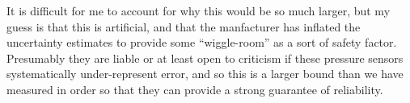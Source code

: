 \documentclass{article}
\begin{document}
It is difficult for me to account for why this would be so much larger, but my 
guess is that this is artificial, and that the manfacturer has inflated the uncertainty estimates
to provide some ``wiggle-room'' as a sort of safety factor. Presumably they are liable or at least open
to criticism if these pressure sensors systematically under-represent error, and so this is a larger 
bound than we have measured in order so that they can provide a strong guarantee of reliability.


\end{document}
